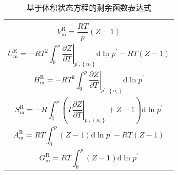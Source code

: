 \documentclass[main.tex]{subfiles}
\begin{document}
\setlength{}
\begin{longtable}{m{}}
    \caption{基于体积状态方程的剩余函数表达式}\label{table:residual_functions_MR}
    \\\hline \\
    \begin{equation}
        V^\text{R}_\text{m}=\frac{RT}{p}\left(Z-1\right)
    \end{equation}                                                                                                                                                                              \\ [-5ex]
    \begin{equation}
        U^\text{R}_\text{m}=-RT^2\int_0^p\left.\frac{\partial Z}{\partial T}\right|_{p^\prime,\left\{n_i\right\}}\mathrm{d}\ln p^\prime-RT\left(Z-1\right)
    \end{equation}                                                                            \\ [-5ex]
    \begin{equation}
        H^\text{R}_\text{m}=-RT^2\int_0^p\left.\frac{\partial Z}{\partial T}\right|_{p^\prime,\left\{n_i\right\}}\mathrm{d}\ln p^\prime
    \end{equation}                                                                                               \\ [-5ex]
    \begin{equation}
        S^\text{R}_\text{m}=-R\int_0^p\left(T\left.\frac{\partial Z}{\partial T}\right|_{p^\prime,\left\{n_i\right\}}+Z-1\right)\mathrm{d}\ln p^\prime
    \end{equation}                                                                                \\ [-5ex]
    \begin{equation}
        A^\text{R}_\text{m}=RT\int_0^p\left(Z-1\right)\mathrm{d}\ln p^\prime-RT\left(Z-1\right)
    \end{equation}                                                                                                                                       \\ [-5ex]
    \begin{equation}
        G^\text{R}_\text{m}=RT\int_0^p\left(Z-1\right)\mathrm{d}\ln p^\prime
    \end{equation}                                                                                                                                                          \\ [-5ex]

\end{longtable}
\end{document}

